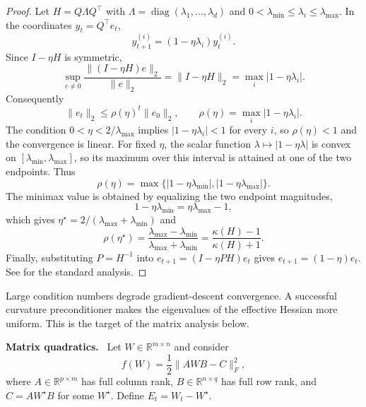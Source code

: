 \documentclass[sigconf,nonacm]{acmart}
\newcommand{\vpara}[1]{\par\noindent\textbf{#1.}\ }
\DeclareMathOperator{\diag}{diag}
\begin{document}
\begin{proof}
Let $H=Q\Lambda Q^\top$ with $\Lambda=\diag(\lambda_1,\ldots,\lambda_d)$ and $0<\lambda_{\min}\leq\lambda_i\leq\lambda_{\max}$. In the coordinates $y_t=Q^\top e_t$,
\begin{equation}
  y_{t+1}^{(i)}=(1-\eta\lambda_i)y_t^{(i)}.
\end{equation}
Since $I-\eta H$ is symmetric,
\begin{equation}
  \sup_{e\neq0}\frac{\|(I-\eta H)e\|_2}{\|e\|_2}
  =\|I-\eta H\|_2
  =\max_i|1-\eta\lambda_i|.
\end{equation}
Consequently
\begin{equation}
  \|e_t\|_2\leq \rho(\eta)^t\|e_0\|_2,\qquad
  \rho(\eta)=\max_i |1-\eta\lambda_i| .
\end{equation}
The condition $0<\eta<2/\lambda_{\max}$ implies $|1-\eta\lambda_i|<1$ for every $i$, so $\rho(\eta)<1$ and the convergence is linear. For fixed $\eta$, the scalar function $\lambda\mapsto |1-\eta\lambda|$ is convex on $[\lambda_{\min},\lambda_{\max}]$, so its maximum over this interval is attained at one of the two endpoints. Thus
\begin{equation}
  \rho(\eta)=\max\{ |1-\eta\lambda_{\min}|, |1-\eta\lambda_{\max}|\}.
\end{equation}
The minimax value is obtained by equalizing the two endpoint magnitudes,
\begin{equation}
  1-\eta\lambda_{\min}=\eta\lambda_{\max}-1,
\end{equation}
which gives $\eta^\star=2/(\lambda_{\max}+\lambda_{\min})$ and
\begin{equation}
  \rho(\eta^\star)=
  \frac{\lambda_{\max}-\lambda_{\min}}
       {\lambda_{\max}+\lambda_{\min}}
  =\frac{\kappa(H)-1}{\kappa(H)+1}.
\end{equation}
Finally, substituting $P=H^{-1}$ into $e_{t+1}=(I-\eta PH)e_t$ gives $e_{t+1}=(1-\eta)e_t$. See \citet{nocedal2006numerical} for the standard analysis.
\end{proof}

Large condition numbers degrade gradient-descent convergence. A successful curvature preconditioner makes the eigenvalues of the effective Hessian more uniform. This is the target of the matrix analysis below.

\vpara{Matrix quadratics} Let $W\in\mathbb{R}^{m\times n}$ and consider
\begin{equation}\label{eq:matrix_obj}
  f(W)=\frac{1}{2}\|AWB-C\|_F^2,
\end{equation}
where $A\in\mathbb{R}^{p\times m}$ has full column rank, $B\in\mathbb{R}^{n\times q}$ has full row rank, and $C=AW^\star B$ for some $W^\star$. Define $E_t=W_t-W^\star$.
\end{document}
